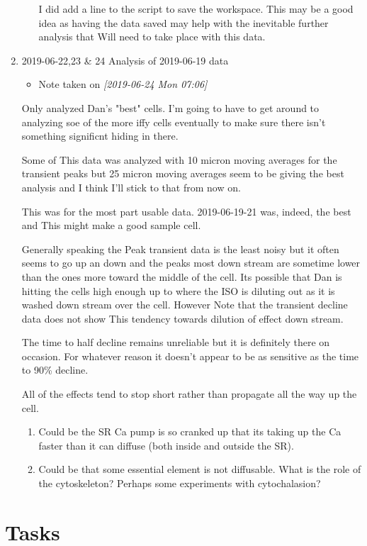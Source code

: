 \documentclass[11pt]{article}
\begin{document}
\begin{enumerate}
\begin{itemize}
I did add a line to the script to save the workspace.  This may be a good idea as having the data saved may help with the inevitable further analysis that Will need to take place with this data.
\end{itemize}
\item 2019-06-22,23 \& 24 Analysis of 2019-06-19 data
\label{sec:org66daace}
\begin{itemize}
\item Note taken on \textit{[2019-06-24 Mon 07:06] } \\
\end{itemize}
Only analyzed Dan's "best" cells.  I'm going to have to get around to analyzing soe of the more iffy cells eventually to make sure there isn't something significnt hiding in there.

Some of This data was analyzed with 10 micron moving averages for the transient peaks but 25 micron moving averages seem to be giving the best analysis and I think I'll stick to that from now on.

This was for the most part usable data.  2019-06-19-21 was, indeed, the best and This might make a good sample cell.

Generally speaking the Peak transient data is the least noisy but it often seems to go up an down and the peaks most down stream are sometime lower than the ones more toward the middle of the cell.   Its possible that Dan is hitting the cells high enough up to where the ISO is diluting out as it is washed down stream over the cell.  However Note that the transient decline data does not show This tendency towards dilution of effect down stream.

The time to half decline remains unreliable but it is definitely there on occasion.  For whatever reason it doesn't appear to be as sensitive as the time to 90\% decline.

All of the effects tend to stop short rather than propagate all the way up the cell.

\begin{enumerate}
\item Could be the SR Ca pump is so cranked up that its taking up the Ca faster than it can diffuse (both inside and outside the SR).
\item Could be that some essential element is not diffusable.  What is the role of the cytoskeleton?  Perhaps some experiments with cytochalasion?
\end{enumerate}
\end{enumerate}
\section{\textbf{Tasks}}
\label{sec:org3908e78}
\end{document}
